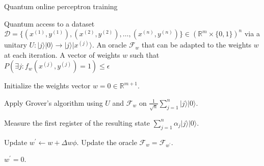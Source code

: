 \documentclass{article}
\begin{document}
\pagestyle{empty}
\begin{algorithm}[ht]
	\caption{Quantum online perceptron training} 
	\begin{algorithmic}[1]
	   \Require Quantum access to a dataset $\mathcal{D}=\{ (x^{(1)},y^{(1)}), (x^{(2)}, y^{(2)} ) ,\ldots, ( x^{(n)},y^{(n)})\} \in (\mathbb{R}^{m} \times\{0,1\})^{n}$ via a unitary $U: |j\rangle|{0}\rangle \rightarrow |j\rangle|x^{(j)}\rangle$. An oracle $\mathcal{F}_w$ that can be adapted to the weights $w$ at each iteration.
    \Ensure A vector of weights $w$ such that $P\left(\exists j: f_{w}\left(x^{(j)}, y^{(j)}\right)=1\right) \leq \epsilon$

    	\State Initialize the weights vector $w = 0 \in \mathbb{R}^{m+1}$.

		
				\State Apply Grover's algorithm using $U$ and $\mathcal{F}_w$ on $\frac{1}{\sqrt{n}}\sum_{j=1}^{n} |j\rangle|0\rangle$.
				
				\State Measure the first register of the resulting state $\sum_{j=1}^{n} \alpha_j|j\rangle|0\rangle$.

					\State Update $w^{\prime} \leftarrow w+\Delta w \phi$.
					\State Update the oracle $\mathcal{F}_w = \mathcal{F}_{w^{\prime}}$.		
				\EndIf

			\EndFor
		
		\EndFor
				
		\Return $w^{\prime}=0$.
	\end{algorithmic}
\end{algorithm}
\end{document}
